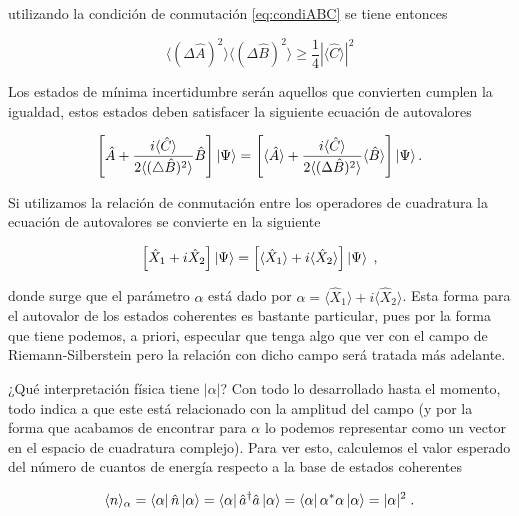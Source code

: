     utilizando la condición de conmutación \ref{eq:condiABC} se tiene entonces

    \begin{equation}
        \langle (\Delta\hat{A})^2 \rangle \langle (\Delta\hat{B})^2 \rangle \geq \frac{1}{4}\left|\langle \hat{C}\rangle\right|^{2}
    \end{equation}

    Los estados de mínima incertidumbre serán aquellos que convierten cumplen la igualdad, estos estados deben satisfacer la siguiente ecuación de autovalores \cite{merzbacher1998quantum}

    \begin{equation}
        \left[\hat{A} + \frac{i \langle \hat{C} \rangle}{2\langle (\triangle \hat{B})^2 \rangle} \hat{B} \right] \ket{\Psi} = \left[\langle \hat{A} \rangle + \frac{i \langle \hat{C} \rangle}{2\langle (\Delta \hat{B})^2 \rangle} \langle \hat{B} \rangle \right]\ket{\Psi}.
    \end{equation}


    Si utilizamos la relación de conmutación entre los operadores de cuadratura la ecuación de autovalores se convierte en la siguiente

    \begin{equation}
        \left[\hat{X}_1 + i\hat{X}_2 \right]\ket{\Psi} = \left[\langle \hat{X}_1 \rangle + i \langle \hat{X}_2 \rangle \right]\ket{\Psi}\;,
    \end{equation}

    donde surge \cite{gerry2005introductory} que el parámetro $\alpha$ está dado por $\alpha = \langle \hat{X}_1 \rangle + i \langle \hat{X}_2 \rangle $. Esta forma para el autovalor de los estados coherentes es bastante particular, pues por la forma que tiene podemos, a priori, especular que tenga algo que ver con el campo de Riemann-Silberstein pero la relación con dicho campo será tratada más adelante.
    
    ¿Qué interpretación física tiene $|\alpha|$? Con todo lo desarrollado hasta el momento, todo indica a que este está relacionado con la amplitud del campo (y por la forma que acabamos de encontrar para $\alpha$ lo podemos representar como un vector en el espacio de cuadratura complejo). Para ver esto, calculemos el valor esperado del número de cuantos de energía respecto a la base de estados coherentes

    \begin{equation}\label{eq:AlphaQuadrado}
        \langle n \rangle_{\alpha} = \bra{\alpha} \hat{n} \ket{\alpha} = \bra{\alpha} \hat{a}^{\dagger} \hat{a} \ket{\alpha} =\bra{\alpha} \alpha^* \alpha \ket{\alpha} = |\alpha|^2\;.
    \end{equation}

